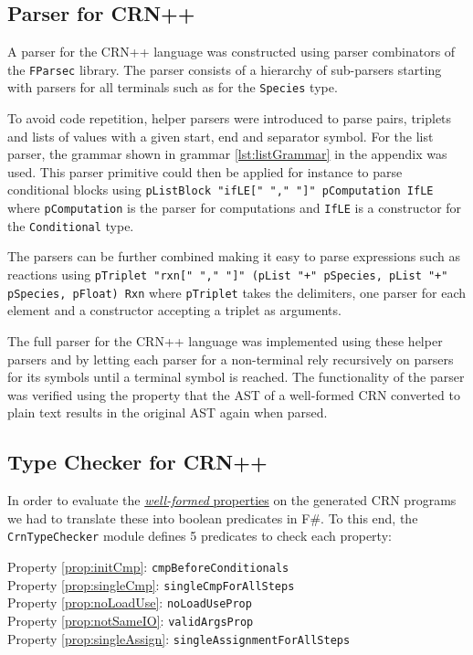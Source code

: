 \subsection{Parser for CRN++} %

A parser for the CRN++ language was constructed using parser combinators of the \texttt{FParsec} library. The parser consists of a hierarchy of sub-parsers starting with parsers for all terminals such as for the \texttt{Species} type.

To avoid code repetition, helper parsers were introduced to parse pairs, triplets and lists of values with a given start, end and separator symbol. For the list parser, the grammar shown in grammar \ref{lst:listGrammar} in the appendix was used. This parser primitive could then be applied for instance to parse conditional blocks using \texttt{pListBlock "ifLE[{" "," "}]" pComputation IfLE} where \texttt{pComputation} is the parser for computations and \texttt{IfLE} is a constructor for the \texttt{Conditional} type. 

The parsers can be further combined making it easy to parse expressions such as reactions using \texttt{pTriplet "rxn[" "," "]" (pList "+" pSpecies, pList "+" pSpecies, pFloat) Rxn} where \texttt{pTriplet} takes the delimiters, one parser for each element and a constructor accepting a triplet as arguments.

The full parser for the CRN++ language was implemented using these helper parsers and by letting each parser for a non-terminal rely recursively on parsers for its symbols until a terminal symbol is reached. The functionality of the parser was verified using the property that the AST of a well-formed CRN converted to plain text results in the original AST again when parsed. 


\subsection{Type Checker for CRN++} %
In order to evaluate the \hyperref[sec:well-formed]{\textit{well-formed} properties} on the generated CRN programs we had to translate these into boolean predicates in F\#. To this end, the \texttt{CrnTypeChecker} module defines 5 predicates to check each property:

Property \ref{prop:initCmp}: \texttt{cmpBeforeConditionals}\\
Property \ref{prop:singleCmp}: \texttt{singleCmpForAllSteps}\\
Property \ref{prop:noLoadUse}: \texttt{noLoadUseProp}\\
Property \ref{prop:notSameIO}: \texttt{validArgsProp}\\
Property \ref{prop:singleAssign}: \texttt{singleAssignmentForAllSteps}

